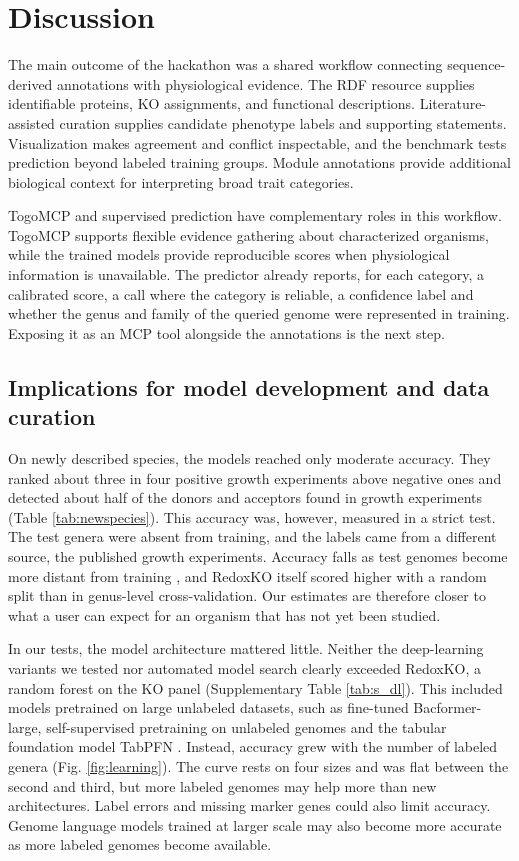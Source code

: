 \documentclass[10pt,a4paper,onecolumn]{article}
\begin{document}
\section{Discussion}\label{discussion}

The main outcome of the hackathon was a shared workflow connecting
sequence-derived annotations with physiological evidence. The RDF
resource supplies identifiable proteins, KO assignments, and functional
descriptions. Literature-assisted curation supplies candidate phenotype
labels and supporting statements. Visualization makes agreement and
conflict inspectable, and the benchmark tests prediction beyond labeled
training groups. Module annotations provide additional biological
context for interpreting broad trait categories.

TogoMCP and supervised prediction have complementary roles in this
workflow. TogoMCP supports flexible evidence gathering about
characterized organisms, while the trained models provide reproducible
scores when physiological information is unavailable. The predictor
already reports, for each category, a calibrated score, a call where the
category is reliable, a confidence label and whether the genus and
family of the queried genome were represented in training. Exposing it
as an MCP tool alongside the annotations is the next step.

\subsection{Implications for model development and data
curation}\label{implications-for-model-development-and-data-curation}

On newly described species, the models reached only moderate accuracy.
They ranked about three in four positive growth experiments above
negative ones and detected about half of the donors and acceptors found
in growth experiments (Table \ref{tab:newspecies}). This accuracy was,
however, measured in a strict test. The test genera were absent from
training, and the labels came from a different source, the published
growth experiments. Accuracy falls as test genomes become more distant
from training \autocite{Hackmann2026}, and RedoxKO itself scored higher
with a random split than in genus-level cross-validation. Our estimates
are therefore closer to what a user can expect for an organism that has
not yet been studied.

In our tests, the model architecture mattered little. Neither the
deep-learning variants we tested nor automated model search clearly
exceeded RedoxKO, a random forest on the KO panel (Supplementary Table
\ref{tab:s_dl}). This included models pretrained on large unlabeled
datasets, such as fine-tuned Bacformer-large, self-supervised
pretraining on unlabeled genomes and the tabular foundation model TabPFN
\autocite{Hollmann2025}. Instead, accuracy grew with the number of
labeled genera (Fig. \ref{fig:learning}). The curve rests on four sizes
and was flat between the second and third, but more labeled genomes may
help more than new architectures. Label errors and missing marker genes
could also limit accuracy. Genome language models trained at larger
scale \autocite{Hwang2024,Nguyen2024} may also become more accurate as
more labeled genomes become available.
\end{document}
